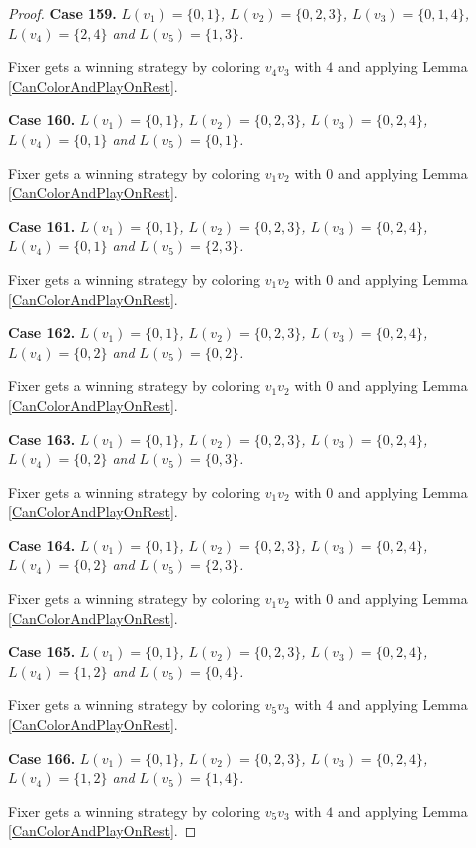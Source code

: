 \documentclass[12pt]{amsart}
\theoremstyle{plain}
\theoremstyle{definition}
\theoremstyle{remark}
\begin{document}
\begin{proof}
\noindent\textbf{Case 159.  }\textit{$L(v_1) = \{0, 1\}$, $L(v_2) = \{0, 2, 3\}$, $L(v_3) = \{0, 1, 4\}$, $L(v_4) = \{2, 4\}$ and $L(v_5) = \{1, 3\}$.}

Fixer gets a winning strategy by coloring $v_4v_3$ with $4$ and applying Lemma \ref{CanColorAndPlayOnRest}.

\noindent\textbf{Case 160.  }\textit{$L(v_1) = \{0, 1\}$, $L(v_2) = \{0, 2, 3\}$, $L(v_3) = \{0, 2, 4\}$, $L(v_4) = \{0, 1\}$ and $L(v_5) = \{0, 1\}$.}

Fixer gets a winning strategy by coloring $v_1v_2$ with $0$ and applying Lemma \ref{CanColorAndPlayOnRest}.

\noindent\textbf{Case 161.  }\textit{$L(v_1) = \{0, 1\}$, $L(v_2) = \{0, 2, 3\}$, $L(v_3) = \{0, 2, 4\}$, $L(v_4) = \{0, 1\}$ and $L(v_5) = \{2, 3\}$.}

Fixer gets a winning strategy by coloring $v_1v_2$ with $0$ and applying Lemma \ref{CanColorAndPlayOnRest}.

\noindent\textbf{Case 162.  }\textit{$L(v_1) = \{0, 1\}$, $L(v_2) = \{0, 2, 3\}$, $L(v_3) = \{0, 2, 4\}$, $L(v_4) = \{0, 2\}$ and $L(v_5) = \{0, 2\}$.}

Fixer gets a winning strategy by coloring $v_1v_2$ with $0$ and applying Lemma \ref{CanColorAndPlayOnRest}.

\noindent\textbf{Case 163.  }\textit{$L(v_1) = \{0, 1\}$, $L(v_2) = \{0, 2, 3\}$, $L(v_3) = \{0, 2, 4\}$, $L(v_4) = \{0, 2\}$ and $L(v_5) = \{0, 3\}$.}

Fixer gets a winning strategy by coloring $v_1v_2$ with $0$ and applying Lemma \ref{CanColorAndPlayOnRest}.

\noindent\textbf{Case 164.  }\textit{$L(v_1) = \{0, 1\}$, $L(v_2) = \{0, 2, 3\}$, $L(v_3) = \{0, 2, 4\}$, $L(v_4) = \{0, 2\}$ and $L(v_5) = \{2, 3\}$.}

Fixer gets a winning strategy by coloring $v_1v_2$ with $0$ and applying Lemma \ref{CanColorAndPlayOnRest}.

\noindent\textbf{Case 165.  }\textit{$L(v_1) = \{0, 1\}$, $L(v_2) = \{0, 2, 3\}$, $L(v_3) = \{0, 2, 4\}$, $L(v_4) = \{1, 2\}$ and $L(v_5) = \{0, 4\}$.}

Fixer gets a winning strategy by coloring $v_5v_3$ with $4$ and applying Lemma \ref{CanColorAndPlayOnRest}.

\noindent\textbf{Case 166.  }\textit{$L(v_1) = \{0, 1\}$, $L(v_2) = \{0, 2, 3\}$, $L(v_3) = \{0, 2, 4\}$, $L(v_4) = \{1, 2\}$ and $L(v_5) = \{1, 4\}$.}

Fixer gets a winning strategy by coloring $v_5v_3$ with $4$ and applying Lemma \ref{CanColorAndPlayOnRest}.


\end{proof}
\end{document}
